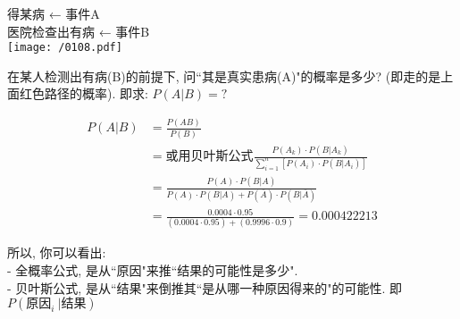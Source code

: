 \documentclass[UTF8]{ctexart}
\begin{document}
\begin{myEnvSample}
得某病 ← 事件A \\
医院检查出有病 ← 事件B \\
\texttt{[image: /0108.pdf]}

在某人检测出有病(B)的前提下, 问``其是真实患病(A)"的概率是多少? (即走的是上面红色路径的概率). 即求: $P(A|B) = ?$ 


\begin{align*}  %
	P(A|B)&=\frac{P(AB)}{P(B)}\\
&=\text{或用贝叶斯公式}\frac{P(A_k)\cdot P(B|A_k)}{\sum_{i=1}^n{\left[ P(A_i)\cdot P(B|A_i) \right]}}\\
&=\frac{P(A)\cdot P(B|A)}{P(A)\cdot P(B|A)+P(\overline{A})\cdot P(B|\overline{A})}\\
&=\frac{0.0004\cdot 0.95}{\left( 0.0004\cdot 0.95 \right) +\left( 0.9996\cdot 0.9 \right)}=0.000422213
\end{align*}
\end{myEnvSample}

所以, 你可以看出: \\
- 全概率公式, 是从``原因"来推``结果的可能性是多少". \\
- 贝叶斯公式, 是从``结果"来倒推其``是从哪一种原因得来的"的可能性. 即 $P(\text{原因}_i\ |\text{结果})$ \\
\end{document}
